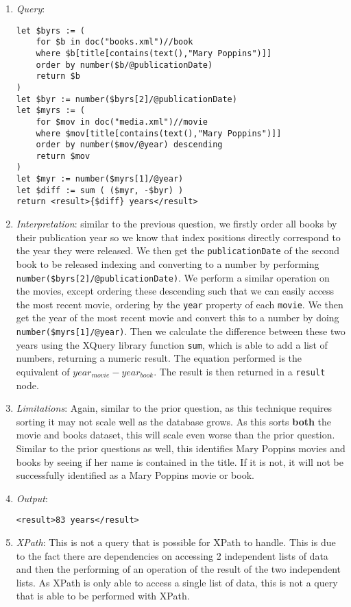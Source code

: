 \documentclass[11pt]{article}
\begin{document}
\begin{enumerate}
\item \textit{Query}:
\begin{small}
\begin{verbatim}
let $byrs := ( 
    for $b in doc("books.xml")//book 
    where $b[title[contains(text(),"Mary Poppins")]] 
    order by number($b/@publicationDate) 
    return $b 
) 
let $byr := number($byrs[2]/@publicationDate) 
let $myrs := ( 
    for $mov in doc("media.xml")//movie 
    where $mov[title[contains(text(),"Mary Poppins")]] 
    order by number($mov/@year) descending 
    return $mov 
) 
let $myr := number($myrs[1]/@year) 
let $diff := sum ( ($myr, -$byr) ) 
return <result>{$diff} years</result>
\end{verbatim}
\end{small}
\item \textit{Interpretation}: similar to the previous question, we firstly order all books by their publication year so we know that index positions directly correspond to the year they were released. We then get the \texttt{publicationDate} of the second book to be released indexing and converting to a number by performing \texttt{number(\$byrs[2]/@publicationDate)}. We perform a similar operation on the movies, except ordering these descending such that we can easily access the most recent movie, ordering by the \texttt{year} property of each \texttt{movie}. We then get the year of the most recent movie and convert this to a number by doing \texttt{number(\$myrs[1]/@year)}. Then we calculate the difference between these two years using the XQuery library function \texttt{sum}, which is able to add a list of numbers, returning a numeric result. The equation performed is the equivalent of $year_{movie}-year_{book}$. The result is then returned in a \texttt{result} node.
\item \textit{Limitations}: Again, similar to the prior question, as this technique requires sorting it may not scale well as the database grows. As this sorts \textbf{both} the movie and books dataset, this will scale even worse than the prior question. Similar to the prior questions as well, this identifies Mary Poppins movies and books by seeing if her name is contained in the title. If it is not, it will not be successfully identified as a Mary Poppins movie or book.
\item \textit{Output}:
\begin{verbatim}
<result>83 years</result>
\end{verbatim} 
\item \textit{XPath}: This is not a query that is possible for XPath to handle. This is due to the fact there are dependencies on accessing 2 independent lists of data and then the performing of an operation of the result of the two independent lists. As XPath is only able to access a single list of data, this is not a query that is able to be performed with XPath.
\end{enumerate}



\end{document}
